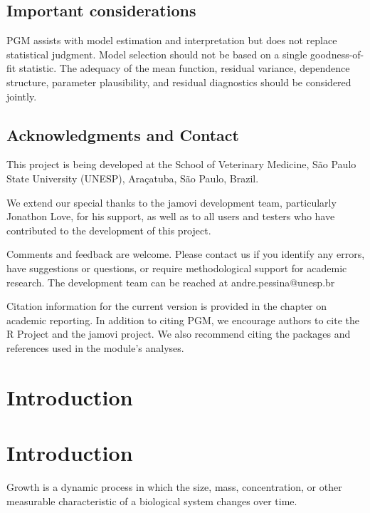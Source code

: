 \documentclass[
  english,
  letterpaper,
  DIV=11,
  numbers=noendperiod]{scrreprt}
\begin{document}
\section{Important considerations}\label{important-considerations}

PGM assists with model estimation and interpretation but does not
replace statistical judgment. Model selection should not be based on a
single goodness-of-fit statistic. The adequacy of the mean function,
residual variance, dependence structure, parameter plausibility, and
residual diagnostics should be considered jointly.

\section{Acknowledgments and Contact}\label{acknowledgments-and-contact}

This project is being developed at the School of Veterinary Medicine,
São Paulo State University (UNESP), Araçatuba, São Paulo, Brazil.

We extend our special thanks to the jamovi development team,
particularly Jonathon Love, for his support, as well as to all users and
testers who have contributed to the development of this project.

Comments and feedback are welcome. Please contact us if you identify any
errors, have suggestions or questions, or require methodological support
for academic research. The development team can be reached at
andre.pessina@unesp.br

Citation information for the current version is provided in the chapter
on academic reporting. In addition to citing PGM, we encourage authors
to cite the R Project and the jamovi project. We also recommend citing
the packages and references used in the module's analyses.


\chapter{Introduction}\label{introduction}


\chapter{Introduction}\label{introduction-1}

Growth is a dynamic process in which the size, mass, concentration, or
other measurable characteristic of a biological system changes over
time.
\end{document}
